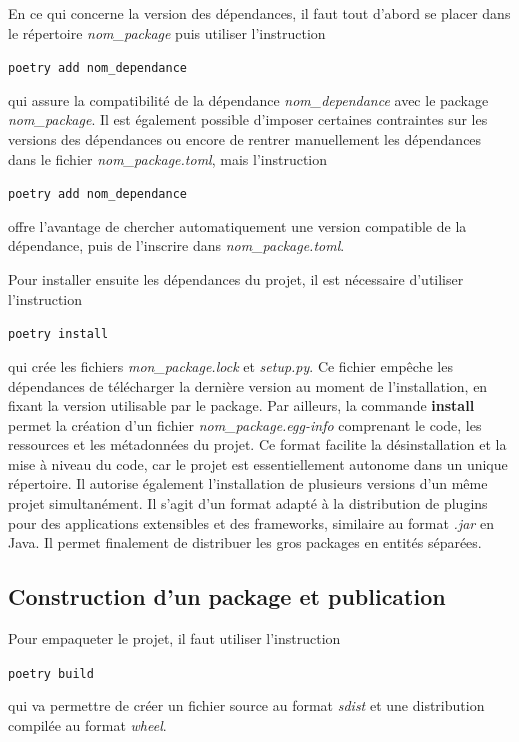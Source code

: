 \documentclass[twoside,a4paper,11pt,frenchb,openany]{report}
\begin{document}
En ce qui concerne la version des dépendances, il faut tout d'abord se placer dans le répertoire \textit{nom\_package} puis utiliser l’instruction
\begin{tcolorbox}\texttt{poetry add nom\_dependance}\end{tcolorbox}  
qui assure la compatibilité de la dépendance \textit{nom\_dependance} avec le package \textit{nom\_package}. Il est également possible d’imposer certaines contraintes sur les versions des dépendances ou encore de rentrer manuellement les dépendances dans le fichier \textit{nom\_package.toml}, mais l’instruction 
\begin{tcolorbox}\texttt{poetry add nom\_dependance}\end{tcolorbox}  
offre l’avantage de chercher automatiquement une version compatible de la dépendance, puis de l’inscrire dans \textit{nom\_package.toml}.

Pour installer ensuite les dépendances du projet, il est nécessaire d’utiliser l’instruction
\begin{tcolorbox}\texttt{poetry install}\end{tcolorbox}
qui crée les fichiers \textit{mon\_package.lock} et \textit{setup.py}. Ce fichier empêche les dépendances de télécharger la dernière version au moment de l’installation, en fixant la version utilisable par le package. Par ailleurs, la commande \textbf{install} permet la création d'un fichier \textit{nom\_package.egg-info} comprenant le code, les ressources et les métadonnées du projet. Ce format facilite la désinstallation et la mise à niveau du code, car le projet est essentiellement autonome dans un unique répertoire. Il autorise également l'installation de plusieurs versions d'un même projet simultanément. Il s'agit d'un format adapté à la distribution de plugins pour des applications extensibles et des frameworks, similaire au format \textit{.jar} en Java. Il permet finalement de distribuer les gros packages en entités séparées.


\subsection{Construction d'un package et publication}

Pour empaqueter le projet, il faut utiliser l’instruction
\begin{tcolorbox}\texttt{poetry build}\end{tcolorbox}
qui va permettre de créer un fichier source au format \textit{sdist} et une distribution compilée au format \textit{wheel}.
\end{document}
